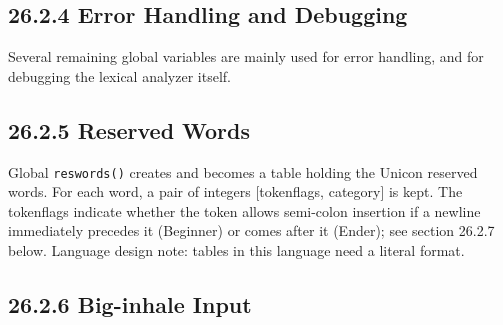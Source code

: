 
\subsection[26.2.4 Error Handling and Debugging]{26.2.4 Error Handling and Debugging}

Several remaining global variables are mainly used for error handling,
and for debugging the lexical analyzer itself.

\subsection[26.2.5 Reserved Words]{26.2.5 Reserved Words}

Global \texttt{reswords()} creates and becomes a table holding the
Unicon reserved words. For each word, a pair of integers [tokenflags,
category] is kept.  The tokenflags indicate whether the token allows
semi-colon insertion if a newline immediately precedes it (Beginner)
or comes after it (Ender); see section 26.2.7 below. Language design
note: tables in this language need a literal format.


\subsection[26.2.6 Big-inhale Input]{26.2.6 Big-inhale Input}


